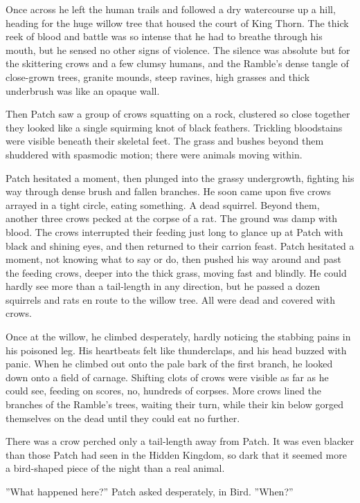 \documentclass[11pt]{article}
\begin{document}
 Once across he left the human trails and followed a dry watercourse up a hill, heading for the huge willow tree that housed the court of King Thorn. The thick reek of blood and battle was so intense that he had to breathe through his mouth, but he sensed no other signs of violence. The silence was absolute but for the skittering crows and a few clumsy humans, and the Ramble's dense tangle of close-grown trees, granite mounds, steep ravines, high grasses and thick underbrush was like an opaque wall.\par
 Then Patch saw a group of crows squatting on a rock, clustered so close together they looked like a single squirming knot of black feathers. Trickling bloodstains were visible beneath their skeletal feet. The grass and bushes beyond them shuddered with spasmodic motion; there were animals moving within.\par
 Patch hesitated a moment, then plunged into the grassy undergrowth, fighting his way through dense brush and fallen branches. He soon came upon five crows arrayed in a tight circle, eating something. A dead squirrel. Beyond them, another three crows pecked at the corpse of a rat. The ground was damp with blood. The crows interrupted their feeding just long to glance up at Patch with black and shining eyes, and then returned to their carrion feast. Patch hesitated a moment, not knowing what to say or do, then pushed his way around and past the feeding crows, deeper into the thick grass, moving fast and blindly. He could hardly see more than a tail-length in any direction, but he passed a dozen squirrels and rats en route to the willow tree. All were dead and covered with crows.\par
 Once at the willow, he climbed desperately, hardly noticing the stabbing pains in his poisoned leg. His heartbeats felt like thunderclaps, and his head buzzed with panic. When he climbed out onto the pale bark of the first branch, he looked down onto a field of carnage. Shifting clots of crows were visible as far as he could see, feeding on scores, no, hundreds of corpses. More crows lined the branches of the Ramble's trees, waiting their turn, while their kin below gorged themselves on the dead until they could eat no further.\par
 There was a crow perched only a tail-length away from Patch. It was even blacker than those Patch had seen in the Hidden Kingdom, so dark that it seemed more a bird-shaped piece of the night than a real animal.\par
 ''What happened here?'' Patch asked desperately, in Bird. ''When?''\par
\end{document}
